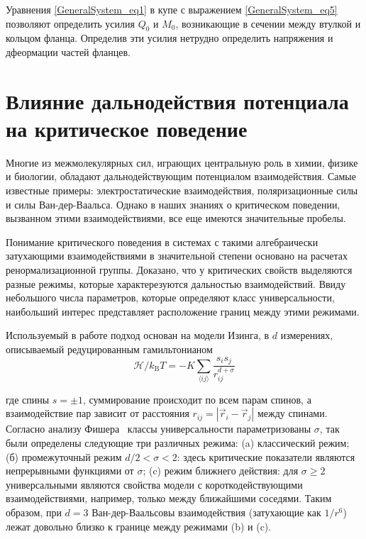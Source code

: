 Уравнения \eqref{GeneralSystem_eq1} в купе с выражением \eqref{GeneralSystem_eq5} позволяют определить усилия $Q_0$ и $M_0$, возникающие в сечении между втулкой и кольцом фланца. 
Определив эти усилия нетрудно определить напряжения и дфеормации частей фланцев.


\section{Влияние дальнодействия потенциала на критическое поведение}

Многие из межмолекулярных сил, играющих центральную роль в химии, физике и биологии, обладают дальнодействующим потенциалом взаимодействия.
Самые известные примеры: электростатические взаимодействия, поляризационные силы и силы Ван-дер-Ваальса.
Однако в наших знаниях о критическом поведении, вызванном этими взаимодействиями, все еще имеются значительные пробелы.

Понимание критического поведения в системах с такими алгебраически затухающими взаимодействиями в значительной степени основано на расчетах ренормализационной группы.
Доказано, что у критических свойств выделяются разные режимы, которые характерезуются дальностью взаимодействий.
Ввиду небольшого числа параметров, которые определяют класс универсальности, наибольший интерес представляет расположение границ между этими режимами.


Используемый в работе подход основан на модели Изинга, в $d$ измерениях, описываемый редуцированным гамильтонианом
\begin{equation}
  \mathcal{H} / k_{\mathrm{B}} T=-K \sum_{\langle i j\rangle} \frac{s_{i} s_{j}}{r_{i j}^{d+\sigma}}
  \label{eq1}
\end{equation}

где спины $s=\pm 1$, суммирование происходит по всем парам спинов, а взаимодействие пар зависит от расстояния $r_{i j}=\left|\vec {r}_{i}-\vec{r}_{j}\right|$ между спинами. 
Согласно анализу Фишера~\cite{10.1103/PhysRevLett.29.917} классы универсальности параметризованы $\sigma$, так были определены следующие три различных режима: (a) классический режим; (б) промежуточный режим $d/2<\sigma<2$: здесь критические показатели являются непрерывными функциями от $\sigma$; (c) режим ближнего действия: для $\sigma\geq 2$ универсальными являются свойства модели с короткодействующими взаимодействиями, например, только между ближайшими соседями. 
Таким образом, при $d=3$ Ван-дер-Ваальсовы взаимодействия (затухающие как $1/r^{6}$) лежат довольно близко к границе между режимами (b) и (c).


